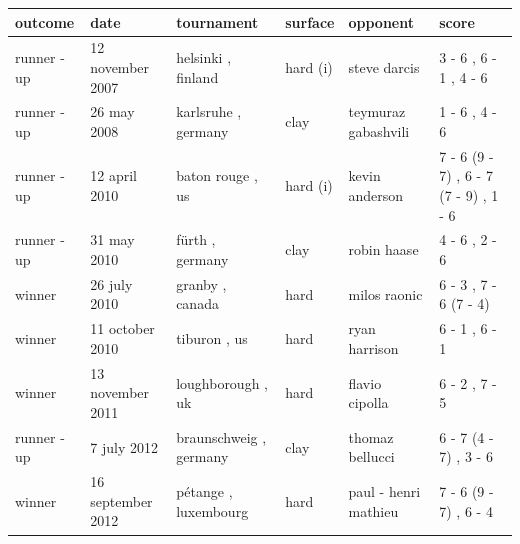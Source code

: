 \documentclass{article}
\begin{document}
\begin{tabular}{llllll}
\toprule
outcome & date & tournament & surface & opponent & score \\
\midrule
runner - up & 12 november 2007 & helsinki , finland & hard (i) & steve darcis & 3 - 6 , 6 - 1 , 4 - 6 \\
runner - up & 26 may 2008 & karlsruhe , germany & clay & teymuraz gabashvili & 1 - 6 , 4 - 6 \\
runner - up & 12 april 2010 & baton rouge , us & hard (i) & kevin anderson & 7 - 6 (9 - 7) , 6 - 7 (7 - 9) , 1 - 6 \\
runner - up & 31 may 2010 & fürth , germany & clay & robin haase & 4 - 6 , 2 - 6 \\
winner & 26 july 2010 & granby , canada & hard & milos raonic & 6 - 3 , 7 - 6 (7 - 4) \\
winner & 11 october 2010 & tiburon , us & hard & ryan harrison & 6 - 1 , 6 - 1 \\
winner & 13 november 2011 & loughborough , uk & hard & flavio cipolla & 6 - 2 , 7 - 5 \\
runner - up & 7 july 2012 & braunschweig , germany & clay & thomaz bellucci & 6 - 7 (4 - 7) , 3 - 6 \\
winner & 16 september 2012 & pétange , luxembourg & hard & paul - henri mathieu & 7 - 6 (9 - 7) , 6 - 4 \\
\bottomrule
\end{tabular}
\end{document}
